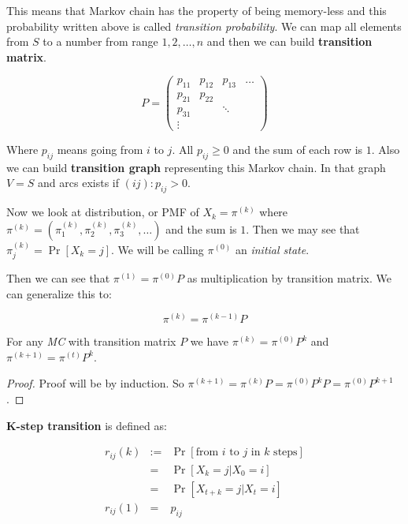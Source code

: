 This means that Markov chain has the property of being memory-less and this probability written above is called \textit{transition probability}. We can map all elements from $S$ to a number from range $1,2,\dots ,n$ and then we can build \textbf{transition matrix}.

$$
P =
\begin{pmatrix}
p_{11} & p_{12} & p_{13} & \dots \\
p_{21} & p_{22} &  \\
p_{31} &  & \ddots \\
\vdots
\end{pmatrix}
$$

Where $p_{ij}$ means going from $i$ to $j$. All $p_{ij} \geq 0$ and the sum of each row is $1$. Also we can build \textbf{transition graph} representing this Markov chain. In that graph $V = S$ and arcs exists if $(ij) : p_{ij} > 0$.

Now we look at distribution, or PMF of $X_{k} = \pi^{(k)}$ where $\pi^{(k)} = \left( \pi_{1}^{(k)}, \pi_{2}^{(k)},\pi_{3}^{(k)}, \dots \right)$ and the sum is $1$. Then we may see that $\pi_{j}^{(k)} = \Pr[X_{k} = j]$. We will be calling $\pi^{(0)}$ an \textit{initial state}.

Then we can see that $\pi^{(1)} = \pi^{(0)} P$ as multiplication by transition matrix. We can generalize this to:

$$
\pi^{(k)} = \pi^{(k-1)} P
$$

\begin{thm}
	For any \textit{MC} with transition matrix $P$ we have $\pi^{(k)} = \pi^{(0)} P^{k}$ and $\pi^{(k+1)} = \pi^{(t)} P^{k}$.
\end{thm}

\begin{proof}
	Proof will be by induction. So $\pi^{(k+1)} = \pi^{(k)} P = \pi^{(0)} P^{k} P =\pi^{(0)} P^{k+1}$.
\end{proof}

\begin{defn}
	\textbf{K-step transition} is defined as:

	$$
	\begin{array}{rcl}
	r_{ij}(k) & := & \Pr[\text{from }i \text{ to } j \text{ in } k \text{ steps}] \\
	& = & \Pr[X_{k} = j \vert X_{0} = i] \\
	& = & \Pr[X_{t+k} = j \vert X_{t} = i] \\
	r_{ij}(1) & = & p_{ij}
	\end{array}
	$$
\end{defn}

